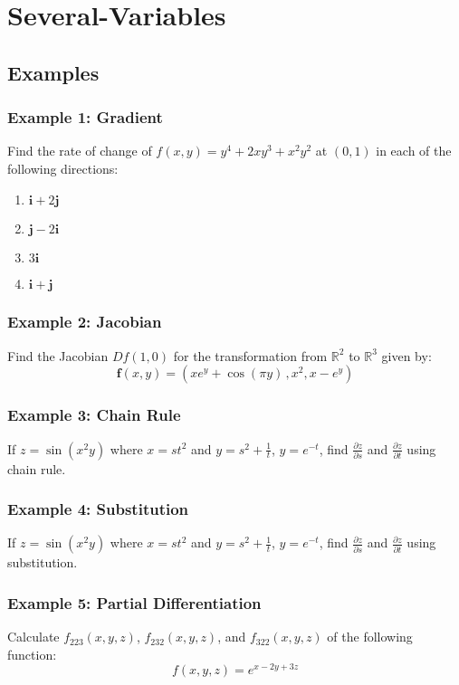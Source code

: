 \section{Several-Variables}

\subsection{Examples}
\subsubsection{Example 1: Gradient}
Find the rate of change of $f(x,y)=y^4+2xy^3+x^2y^2$ at $(0,1)$ in each of the following directions:
\begin{enumerate}
  \item $\mathbf{i}+2\mathbf{j}$
  \item $\mathbf{j}-2\mathbf{i}$
  \item $3\mathbf{i}$
  \item $\mathbf{i}+\mathbf{j}$
\end{enumerate}

\subsubsection{Example 2: Jacobian}
Find the Jacobian $Df(1,0)$ for the transformation from $\mathbb{R}^2$ to $\mathbb{R}^3$ given by:
$$\mathbf{f}(x,y)=(x e^{y}+\cos(\pi y)\,,x^{2},x-e^{y})$$

\subsubsection{Example 3: Chain Rule}
If $z=\sin(x^2y)$ where $x=st^2$ and $y=s^2+\frac{1}{t}$, $y=e^{-t}$, find $\frac{\partial z}{\partial s}$ and $\frac{\partial z}{\partial t}$ using chain rule.

\subsubsection{Example 4: Substitution}
If $z=\sin(x^2y)$ where $x=st^2$ and $y=s^2+\frac{1}{t}$, $y=e^{-t}$, find $\frac{\partial z}{\partial s}$ and $\frac{\partial z}{\partial t}$ using substitution.

\subsubsection{Example 5: Partial Differentiation}
Calculate $f_{223}(x,y,z)$, $f_{232}(x,y,z)$, and $f_{322}(x,y,z)$ of the following function:
$$f(x,y,z)=e^{x-2y+3z}$$
